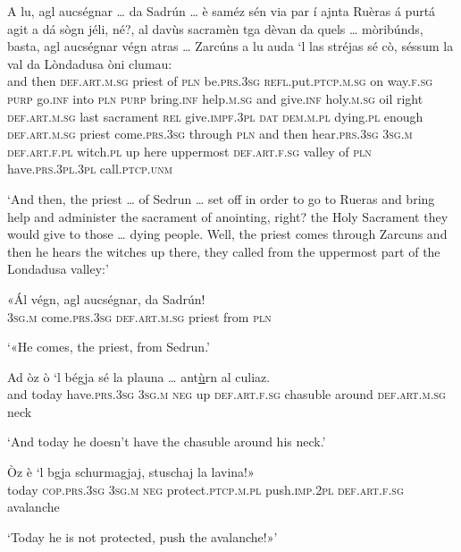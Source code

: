 \begin{linenumbers}
\gll    A lu, agl aucségnar … da Sadrún … è saméz sén via par í ajnta Ruèras á purtá agit a dá sògn jéli, né?, al davùs sacramèn tga dèvan da quels … mòribúnds, basta, agl aucségnar végn atras … Zarcúns a lu auda `l las stréjas sé cò, séssum la val da Lòndadusa òni clumau:\\
and then \textsc{def.art.m.sg} priest {} of \textsc{pln} {} be.\textsc{prs.3sg} \textsc{refl.}put.\textsc{ptcp.m.sg} on way.\textsc{f.sg} \textsc{purp} go.\textsc{inf} into \textsc{pln}  \textsc{purp} bring.\textsc{inf} help.\textsc{m.sg} and give.\textsc{inf} holy.\textsc{m.sg} oil right \textsc{def.art.m.sg} last sacrament \textsc{rel} give.\textsc{impf.3pl} \textsc{dat} \textsc{dem.m.pl} {} dying.\textsc{pl} enough \textsc{def.art.m.sg} priest come.\textsc{prs.3sg} through {} \textsc{pln} and then hear.\textsc{prs.3sg} \textsc{3sg.m} \textsc{def.art.f.pl} witch.\textsc{pl} up here uppermost \textsc{def.art.f.sg} valley of \textsc{pln} have.\textsc{prs.3pl.3pl} call.\textsc{ptcp.unm}\\
\end{linenumbers}
\medskip
\glt `And then, the priest … of Sedrun … set off in order to go to Rueras and bring help and administer the sacrament of anointing, right? the Holy Sacrament they would give to those … dying people. Well, the priest comes through Zarcuns and then he hears the witches up there, they called from the uppermost part of the Londadusa valley:'
\medskip

\begin{linenumbers}
\gll  «Ál végn, agl aucségnar, da Sadrún! \\
 \textsc{3sg.m} come.\textsc{prs.3sg} \textsc{def.art.m.sg} priest from \textsc{pln}\\
\end{linenumbers}
\medskip
\glt `«He comes, the priest, from Sedrun.'
\medskip

\begin{linenumbers}
\gll    Ad òz ò `l bégja sé la plauna … ant\underline{ù}rn al culiaz.\\
and today have.\textsc{prs.3sg} \textsc{3sg.m} \textsc{neg} up \textsc{def.art.f.sg} chasuble {} around \textsc{def.art.m.sg} neck\\
\end{linenumbers}
\medskip
\glt `And today he doesn’t have the chasuble around his neck.'
\medskip

\begin{linenumbers}
\gll  Òz è `l bgja schurmagjaj\footnotemark, stuschaj la lavina!» \\
today \textsc{cop.prs.3sg} \textsc{3sg.m} \textsc{neg} protect.\textsc{ptcp.m.pl} push.\textsc{imp.2pl} \textsc{def.art.f.sg} avalanche \\
\end{linenumbers}
\medskip
\glt `Today he is not protected, push the avalanche!»'
\medskip

